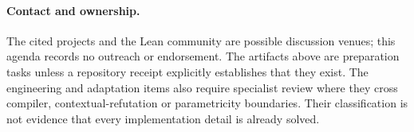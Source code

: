\paragraph{Contact and ownership.}
The cited projects and the Lean community are possible discussion venues;
this agenda records no outreach or endorsement. The artifacts above are
preparation tasks unless a repository receipt explicitly establishes that
they exist. The engineering and adaptation items also require specialist
review where they cross compiler, contextual-refutation or parametricity
boundaries. Their classification is not evidence that every implementation
detail is already solved.
